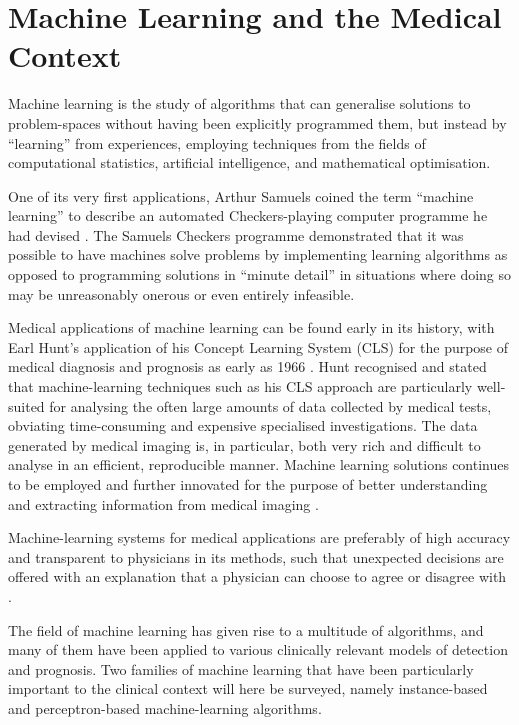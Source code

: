 \section{Machine Learning and the Medical Context}

Machine learning is the study of algorithms that can generalise solutions to problem-spaces without having been explicitly programmed them, but instead by ``learning'' from experiences, employing techniques from the fields of computational statistics, artificial intelligence, and mathematical optimisation.

One of its very first applications, Arthur Samuels coined the term ``machine learning'' to describe an automated Checkers-playing computer programme he had devised \citep{samuel_draughts}. The Samuels Checkers programme demonstrated that it was possible to have machines solve problems by implementing learning algorithms as opposed to programming solutions in ``minute detail'' in situations where doing so may be unreasonably onerous or even entirely infeasible.

Medical applications of machine learning can be found early in its history, with Earl Hunt's application of his Concept Learning System (CLS) for the purpose of medical diagnosis and prognosis as early as 1966 \citep{hunt1966}. Hunt recognised and stated that machine-learning techniques such as his CLS approach are particularly well-suited for analysing the often large amounts of data collected by medical tests, obviating time-consuming and expensive specialised investigations. The data generated by medical imaging is, in particular, both very rich and difficult to analyse in an efficient, reproducible manner. Machine learning solutions continues to be employed and further innovated for the purpose of better understanding and extracting information from medical imaging \citep{med_imaging_review}.

Machine-learning systems for medical applications are preferably of high accuracy and transparent to physicians in its methods, such that unexpected decisions are offered with an explanation that a physician can choose to agree or disagree with \citep{med_ml_review}.

The field of machine learning has given rise to a multitude of algorithms, and many of them have been applied to various clinically relevant models of detection and prognosis. Two families of machine learning that have been particularly important to the clinical context will here be surveyed, namely instance-based and perceptron-based machine-learning algorithms.

